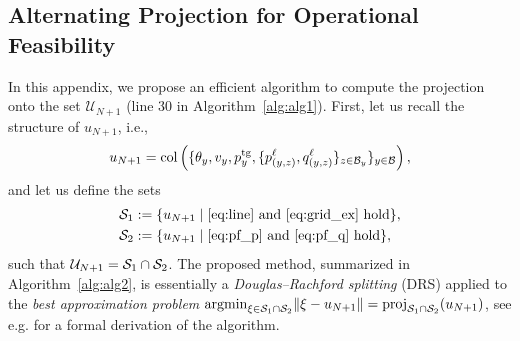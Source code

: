 \subsection{Alternating Projection for Operational Feasibility}
\label{APA}
In this appendix, we propose an efficient algorithm to compute the projection onto the set $\mathcal{U}_{N+1}$  (line 30 in Algorithm~\ref{alg:alg1}). First, let us recall the structure of $u_{N+1}$, i.e.,
$$u_{N+1}=\operatorname{col}\left(\{\theta_y, v_y, p_y^{\mathrm{tg}},\{p_{(y,z)}^{\ell},q_{(y,z)}^{\ell}\}_{z \in \mathcal B_y} \}_{y\in\mathcal B} \right),$$ and let us define the sets
\begin{align}
	\mathcal S_1 &:= \{u_{N+1} \mid \text{\eqref{eq:line} and \eqref{eq:grid_ex} hold}\},\\
	\mathcal S_2 &:= \{u_{N+1} \mid \text{\eqref{eq:pf_p} and \eqref{eq:pf_q} hold}\},
\end{align}
such that $\mathcal{U}_{N+1} = \mathcal S_1 \cap \mathcal S_2$. 
%
The proposed method, summarized in Algorithm~\ref{alg:alg2}, is essentially a \textit{Douglas--Rachford splitting} (DRS) \cite[\S~26.3]{bauschke2011convex} applied to the \textit{best approximation problem} $ {\operatorname{argmin}}_{\xi \in \mathcal S_1 \cap \mathcal S_2}  \|\xi-u_{N+1}\| =\mathrm{proj}_{\mathcal S_1 \cap \mathcal S_2}(u_{N+1}) $, see e.g. \cite[\S~4.3]{bauschke2015projection} for a formal derivation of the algorithm.

